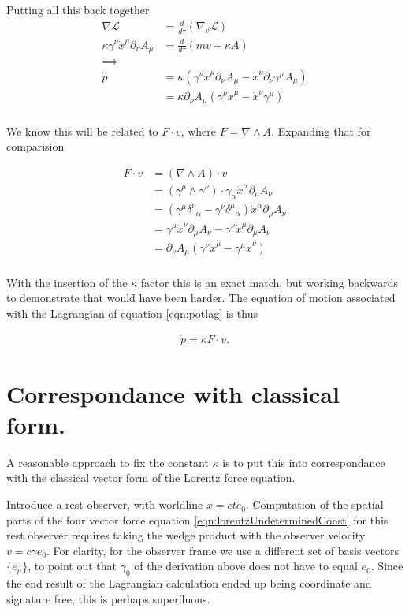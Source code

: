 \documentclass{article}
\newcommand{\grad}[0]{\nabla}
\newcommand{\LL}[0]{\mathcal{L}}
\newcommand{\xdot}[0]{\dot{x}}
\newcommand{\pdot}[0]{\dot{p}}
\begin{document}
Putting all this back together 
\begin{align*}
\grad \LL &= \frac{d}{d\tau}(\grad_v \LL) \\
\kappa \gamma^\nu \xdot^\mu \partial_\nu A_\mu &= \frac{d}{d\tau}\left( m v + \kappa A \right) \\
\implies \\
\pdot 
&= \kappa \left( \gamma^\nu \xdot^\mu \partial_\nu A_\mu - \xdot^\nu \partial_\nu \gamma^\mu A_\mu \right) \\
&= \kappa \partial_\nu A_\mu \left( \gamma^\nu \xdot^\mu - \xdot^\nu \gamma^\mu \right) \\
\end{align*}

We know this will be related to $F \cdot v$, where $F = \grad \wedge A$.  Expanding that for comparision

\begin{align*}
F \cdot v
&= (\grad \wedge A) \cdot v \\
&= (\gamma^\mu \wedge \gamma^\nu) \cdot \gamma_\alpha \xdot^\alpha \partial_\mu A_\nu \\
&= \left( \gamma^\mu {\delta^\nu}_\alpha -\gamma^\nu {\delta^\mu}_\alpha \right) \xdot^\alpha \partial_\mu A_\nu \\
&= 
\gamma^\mu \xdot^\nu \partial_\mu A_\nu 
-\gamma^\nu \xdot^\mu \partial_\mu A_\nu \\
&= \partial_\nu A_\mu \left( \gamma^\nu \xdot^\mu -\gamma^\mu \xdot^\nu \right) \\
\end{align*}

With the insertion of the $\kappa$ factor this is an exact match, but working backwards to demonstrate that would have been harder.  The equation of motion associated with the Lagrangian of equation \ref{eqn:potlag} is thus

\begin{align}\label{eqn:lorentzUndeterminedConst}
\pdot = \kappa F \cdot v.
\end{align}

\section{ Correspondance with classical form. }

A reasonable approach to fix the constant $\kappa$ is to put this into correspondance with the classical
vector form of the Lorentz force equation.

Introduce a rest observer, with worldline $x = ct e_0$.  Computation of the spatial parts of the four vector force equation \ref{eqn:lorentzUndeterminedConst} for this rest observer requires taking the wedge product
with the observer velocity $v = c \gamma e_0$.
For clarity, for the observer frame we use a different set of basis vectors $\{e_\mu\}$, to point
out that $\gamma_0$ of the derivation above does not have to equal $e_0$.  Since the end result of the Lagrangian calculation
ended up being coordinate and signature free, this is perhaps superfluous.
\end{document}
